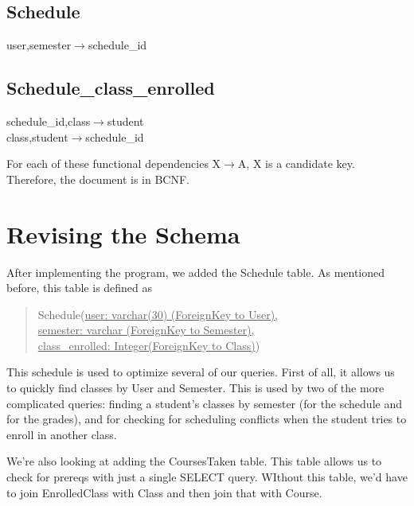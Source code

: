 \documentclass[11pt,oneside,a4paper]{article}
\begin{document}
\subsection{Schedule}
\hspace*{0.5in}user,semester$\rightarrow$schedule\_id 


\subsection{Schedule\_class\_enrolled}
\hspace*{0.5in}schedule\_id,class$\rightarrow$student \\
\hspace*{0.5in}class,student$\rightarrow$schedule\_id 

For each of these functional dependencies X$\rightarrow$A, X is a candidate
key. Therefore, the document is in BCNF.
\section{Revising the Schema}
After implementing the program, we added the Schedule table. As mentioned
before, this table is defined as 
\begin{quote}
Schedule(\underline{user: varchar(30) (ForeignKey to User),} \\
\underline{semester: varchar (ForeignKey to Semester),}\\
\underline{class\_enrolled: Integer(ForeignKey to Class)})
\end{quote}

This schedule is used to optimize several of our queries. First of all, it
allows us to quickly find classes by User and Semester. This is used by two of
the more complicated queries: finding a student's classes by semester (for the
schedule and for the grades), and for checking for scheduling conflicts when
the student tries to enroll in another class.

We're also looking at adding the CoursesTaken table. This table allows us to
check for prereqs with just a single SELECT query. WIthout this table, we'd
have to join EnrolledClass with Class and then join that with Course.
\end{document}
